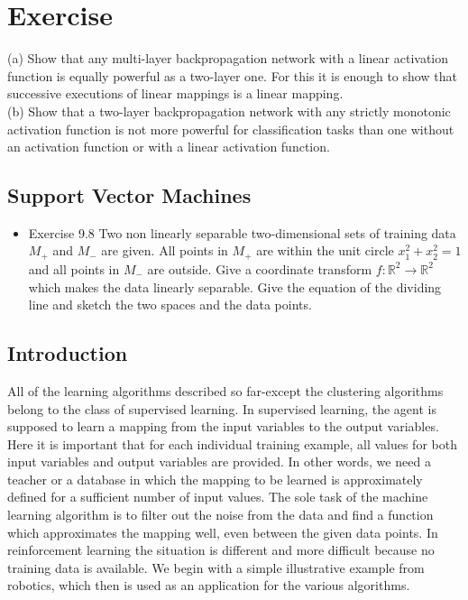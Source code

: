 \documentclass[10pt]{book}
\begin{document}
\section{Exercise}
(a) Show that any multi-layer backpropagation network with a linear activation function is equally powerful as a two-layer one. For this it is enough to show that successive executions of linear mappings is a linear mapping.\\
(b) Show that a two-layer backpropagation network with any strictly monotonic activation function is not more powerful for classification tasks than one without an activation function or with a linear activation function.

\subsection{Support Vector Machines}
\begin{itemize}
  \item Exercise 9.8 Two non linearly separable two-dimensional sets of training data $M_{+}$ and $M_{-}$ are given. All points in $M_{+}$ are within the unit circle $x_{1}^{2}+x_{2}^{2}=1$ and all points in $M_{-}$ are outside. Give a coordinate transform $f: \mathbb{R}^{2} \rightarrow \mathbb{R}^{2}$ which makes the data linearly separable. Give the equation of the dividing line and sketch the two spaces and the data points.
\end{itemize}

\subsection{Introduction}
All of the learning algorithms described so far-except the clustering algorithms belong to the class of supervised learning. In supervised learning, the agent is supposed to learn a mapping from the input variables to the output variables. Here it is important that for each individual training example, all values for both input variables and output variables are provided. In other words, we need a teacher or a database in which the mapping to be learned is approximately defined for a sufficient number of input values. The sole task of the machine learning algorithm is to filter out the noise from the data and find a function which approximates the mapping well, even between the given data points.
In reinforcement learning the situation is different and more difficult because no training data is available. We begin with a simple illustrative example from robotics, which then is used as an application for the various algorithms.
\end{document}
